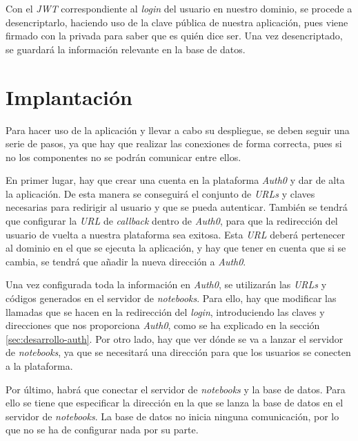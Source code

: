 \documentclass[11pt,spanish,listoffigures]{tfgetsinf}
\begin{document}
Con el \textit{JWT} correspondiente al \textit{login} del usuario en nuestro dominio, se procede a desencriptarlo, haciendo uso de la clave pública de nuestra aplicación, pues viene firmado con la privada para saber que es quién dice ser. Una vez desencriptado, se guardará la información relevante en la base de datos.





\chapter{Implantación}
\label{ch:implantacion}

Para hacer uso de la aplicación y llevar a cabo su despliegue, se deben seguir una serie de pasos, ya que hay que realizar las conexiones de forma correcta, pues si no los componentes no se podrán comunicar entre ellos.

En primer lugar, hay que crear una cuenta en la plataforma \textit{Auth0} y dar de alta la aplicación. De esta manera se conseguirá el conjunto de \textit{URLs} y claves necesarias para redirigir al usuario y que se pueda autenticar. También se tendrá que configurar la \textit{URL} de \textit{callback} dentro de \textit{Auth0}, para que la redirección  del usuario de vuelta a nuestra plataforma sea exitosa. Esta \textit{URL} deberá pertenecer al dominio en el que se ejecuta la aplicación, y hay que tener en cuenta que si se cambia, se tendrá que añadir la nueva dirección a \textit{Auth0}.

Una vez configurada toda la información en \textit{Auth0}, se utilizarán las \textit{URLs} y códigos generados en el servidor de \textit{notebooks}. Para ello, hay que modificar las llamadas que se hacen en la redirección del \textit{login}, introduciendo las claves y direcciones que nos proporciona \textit{Auth0}, como se ha explicado en la sección \ref{sec:desarrollo-auth}. Por otro lado, hay que ver dónde se va a lanzar el servidor de \textit{notebooks}, ya que se necesitará una dirección para que los usuarios se conecten a la plataforma.

Por último, habrá que conectar el servidor de \textit{notebooks} y la base de datos. Para ello se tiene que especificar la dirección en la que se lanza la base de datos en el servidor de \textit{notebooks}. La base de datos no inicia ninguna comunicación, por lo que no se ha de configurar nada por su parte. 
\end{document}
